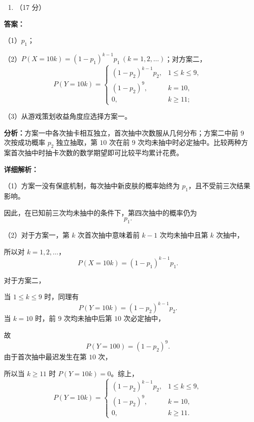 \documentclass[UTF8,11pt,a4paper]{ctexart}
\providecommand{\tightlist}{%
  \setlength{\itemsep}{0pt}\setlength{\parskip}{0pt}}
\begin{document}
\begin{enumerate}
\def\labelenumi{\arabic{enumi}.}
\setcounter{enumi}{18}
\tightlist
\item
  （17 分）
\end{enumerate}

\textbf{答案：}
\par\smallskip\noindent（1）\(p_1\)；
\par\smallskip\noindent（2）\(P(X=10k)=(1-p_1)^{k-1}p_1\ (k=1,2,\ldots)\)；对方案二，
\[
   P(Y=10k)=
   \begin{cases}
   (1-p_2)^{k-1}p_2,&1\le k\le9,\\
   (1-p_2)^9,&k=10,\\
   0,&k\ge11;
   \end{cases}
   \]

\par\smallskip\noindent（3）从游戏策划收益角度应选择方案一。

\textbf{分析：}方案一中各次抽卡相互独立，首次抽中次数服从几何分布；方案二中前 \(9\) 次按成功概率 \(p_2\) 独立抽取，第 \(10\) 次在前 \(9\) 次均未抽中时必定抽中。比较两种方案首次抽中时抽卡次数的数学期望即可比较平均累计花费。

\textbf{详细解析：}


\par\smallskip\noindent（1）方案一没有保底机制，每次抽中新皮肤的概率始终为 \(p_1\)，且不受前三次结果影响。

因此，在已知前三次均未抽中的条件下，第四次抽中的概率仍为
\[
   \boxed{p_1}.
   \]


\par\smallskip\noindent（2）对于方案一，第 \(k\) 次首次抽中意味着前 \(k-1\) 次均未抽中且第 \(k\) 次抽中，

所以对 \(k=1,2,\ldots\)，
\[
   \boxed{P(X=10k)=(1-p_1)^{k-1}p_1}.
   \]

对于方案二，

当 \(1\le k\le9\) 时，同理有
\[
   P(Y=10k)=(1-p_2)^{k-1}p_2.
   \]
当 \(k=10\) 时，前 \(9\) 次均未抽中后第 \(10\) 次必定抽中，

故
\[
   P(Y=100)=(1-p_2)^9.
   \]
由于首次抽中最迟发生在第 \(10\) 次，

所以当 \(k\ge11\) 时 \(P(Y=10k)=0\)。综上，
\[
   \boxed{
   P(Y=10k)=
   \begin{cases}
   (1-p_2)^{k-1}p_2,&1\le k\le9,\\
   (1-p_2)^9,&k=10,\\
   0,&k\ge11.
   \end{cases}}
   \]
\end{document}
